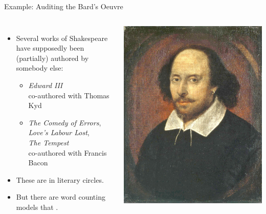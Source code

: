 \documentclass[professionalfonts, xcolor={usenames,svgnames,x11names,table}]{beamer}
\begin{document}
\begin{frame}{Example: Auditing the Bard's Oeuvre}
    \begin{columns}
        \begin{itemize}
            \item Several works of Shakespeare have supposedly been (partially) authored by somebody else:
                \begin{itemize}
                    \item \emph{Edward III}\\
                        co-authored with Thomas Kyd
                    \item \emph{The Comedy of Errors},\\
                        \emph{Love's Labour Lost},\\
                        \emph{The Tempest}\\
                        co-authored with Francis Bacon
                \end{itemize}
            \item These are  in literary circles.
            \item But there are word counting models that .
        \end{itemize}

        \includegraphics[width=1\linewidth]{./img/shakespeare}
    \end{columns}
\end{frame}
\end{document}
